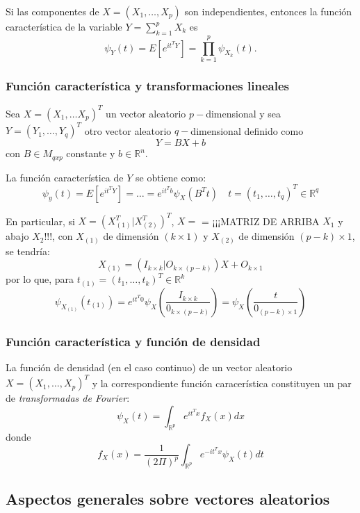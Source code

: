 \begin{nprop}
  Si las componentes de \(X=(X_1,\dots, X_p)\) son independientes, entonces la función característica de la variable \(Y=\sum_{k=1}^p X_k\) es \[\psi_Y(t)=E[e^{it^TY}] = \prod_{k=1}^p\psi_{X_k}(t).\]
\end{nprop}

\subsubsection{Función característica y transformaciones lineales}

Sea $X = (X_1, \dots X_p)^T$ un vector aleatorio $p-$dimensional y sea $Y = (Y_1,\dots,Y_q)^T$ otro vector aleatorio $q-$dimensional definido como
\[
Y = BX + b
\]
con $B \in M_{qxp}$ constante y $b\in \mathbb R ^n$.

\begin{nprop}
  La función característica de $Y$ se obtiene como:
  \[
  \psi_y(t) = E[e^{it^T Y}] = \dots = e^{it^T b} \psi_X(B^T t) \quad t = (t_1,\dots,t_q)^T \in \mathbb R^q
  \]
\end{nprop}
  En particular, si $X= ( X_{(1)}^T | X_{(2)}^T)^T$, $X=$ = ¡¡¡MATRIZ DE ARRIBA $X_1$ y abajo $X_2$!!!, con $X_{(1)}$ de dimensión $(k\times1)$ y $X_{(2)}$ de dimensión $(p-k) \times 1$, se tendría:
  \[
X_{(1)} = ( I_{k\times k} | O_{k \times(p-k)})X + O_{k\times 1}
\]
por lo que, para $t_{(1)} = (t_1,\dots,t_k)^T \in \mathbb R^k$
\[
\psi_{X_{(1)}}(t_{(1)}) = e^{it^T 0} \psi_X(\frac{I_{k\times k}}{0_{k\times(p-k)}} ) = \psi_X(\frac{t}{0_{(p-k)\times1}})
\]

\subsubsection{Función característica y función de densidad}

La función de densidad (en el caso continuo) de un vector aleatorio $X = (X_1,\dots,X_p)^T$ y la correspondiente función caracerística constituyen un par de \emph{transformadas de Fourier}:
\[
\psi_X(t) = \int_{\mathbb R ^p} e^{i t^T x} f_X(x) dx 
\]
donde
\[
f_X(x) =  \dfrac{1}{(2\Pi)^p} \int_{\mathbb R^p} e^{- i t^T x} \psi_X(t) dt
\]


\subsection{Aspectos generales sobre vectores aleatorios}
